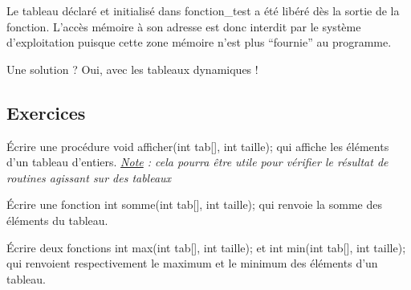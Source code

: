 \documentclass[../../../main.tex]{subfiles}
\begin{document}
Le tableau déclaré et initialisé dans \textsf{fonction\_test} a été libéré dès la sortie de la fonction. L'accès mémoire à son adresse est donc interdit par le système d'exploitation puisque cette zone mémoire n'est plus ``fournie'' au programme.
 
Une solution ? Oui, avec les tableaux dynamiques !
\subsection{Exercices}
Écrire une procédure \textsf{void afficher(int tab[], int taille);} qui affiche les éléments d'un tableau d'entiers.\newline
\textit{\underline{Note} : cela pourra être utile pour vérifier le résultat de routines agissant sur des tableaux}
 
Écrire une fonction \textsf{int somme(int tab[], int taille);} qui renvoie la somme des éléments du tableau.
 
Écrire deux fonctions \textsf{int max(int tab[], int taille);} et \textsf{int min(int tab[], int taille);} qui renvoient respectivement le maximum et le minimum des éléments d'un tableau.
\end{document}
